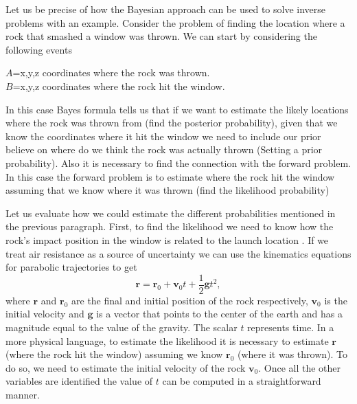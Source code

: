 \documentclass[12pt]{book}
\begin{document}
Let us be precise of how the Bayesian approach can be used to solve inverse problems with an example. 
Consider the problem of finding the location where a rock that smashed a window was thrown. We can
start by considering the following events
\begin{center}
$A$=x,y,z coordinates where the rock was thrown.\\
$B$=x,y,z coordinates where the rock hit the window.
\end{center}
In this case Bayes formula  tells us that if we want to estimate the likely locations  where the rock was 
thrown from (find the posterior probability), given that we 
know the coordinates where it hit the window we need to include our prior believe on where
do we think the rock was actually thrown (Setting a prior probability). Also it is necessary
to find the connection with the forward problem. In this case the forward problem is to estimate where
the rock hit the window assuming that we know where it was thrown (find the likelihood probability) 
\newline



Let us evaluate how we could estimate the different probabilities mentioned in the previous paragraph. 
First, to find the likelihood
we need to know how the rock's impact position  in the window  is related to the launch location 
. If we treat air resistance as a source of uncertainty  we can use
the kinematics equations  for parabolic trajectories to get \cite{arnol2013mathematical}
\begin{equation}\label{eqnKinematics}
\textbf{r}=\textbf{r}_{0}+\textbf{v}_{0}t+\frac{1}{2}\textbf{g}t^{2},
\end{equation} 
where $\textbf{r}$ and $\textbf{r}_{0}$ are the final and initial position of the rock respectively, 
$\textbf{v}_{0}$ is 
the initial velocity  and $\textbf{g}$ is  a vector that points to the center of the earth and has a 
magnitude equal to the value of the gravity. The scalar $t$ represents time.
In a more physical language, to estimate the likelihood it is necessary to estimate $\textbf{r}$ (where the 
rock hit the window) assuming we know $\textbf{r}_{0}$ (where it was thrown). 
To do so,
we  need to estimate the initial velocity of the rock $\textbf{v}_{0}$. 
Once all the other variables are identified the value of $t$ can be computed in a straightforward manner. 
\end{document}
